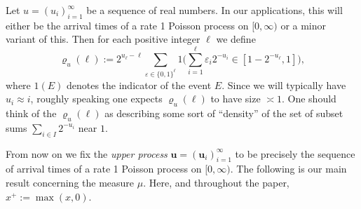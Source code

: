 \documentclass[11pt,reqno]{amsart}
\numberwithin{equation}{section}
\theoremstyle{definition}
\theoremstyle{remark}
\newcommand{\mbf}{\mathbf}
\newcommand{\eps}{\varepsilon}
\begin{document}
Let $u = (u_i)_{i = 1}^{\infty}$ be a sequence of real numbers. In our applications, this will either be the arrival times of a rate 1 Poisson process on $[0,\infty)$ or a minor variant of this. Then for each positive integer $\ell$ we define
\begin{equation}\label{x-stat-def} \varrho_{u}(\ell) :=  2^{u_{\ell} - \ell}\sum_{\eps \in \{0,1\}^{\ell}} 1 \big(\sum_{i = 1}^{\ell} \eps_i 2^{-u_i} \in [1 - 2^{-u_{\ell}}, 1]\big),\end{equation} where $1(E)$ denotes the indicator of the event $E$.
Since we will typically have $u_i \approx i$, roughly speaking one expects $\varrho_{u}(\ell)$ to have size $\asymp 1$. One should think of the $\varrho_{u}(\ell)$ as describing some sort of ``density'' of the set of subset sums $\sum_{i \in I} 2^{-u_i}$ near $1$.

From now on we fix the \emph{upper process} $\mbf{u} = (\mbf{u}_i)_{i = 1}^{\infty}$ to be precisely the sequence of arrival times of a rate 1 Poisson process on $[0,\infty)$. The following is our main result concerning the measure $\mu$. Here, and throughout the paper, $x^+ := \max(x, 0)$.
\end{document}
